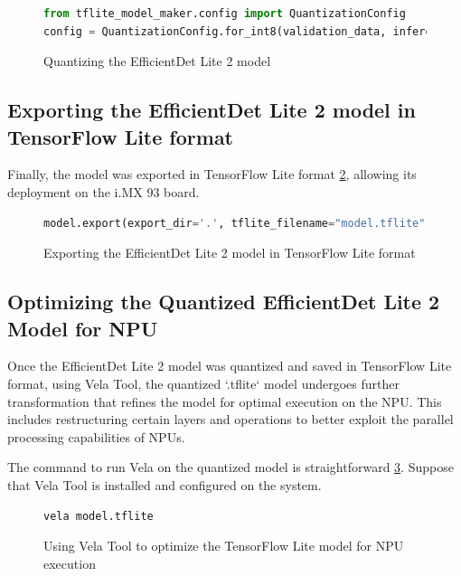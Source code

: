 \begin{figure}[H]
\begin{lstlisting}[language=Python]
from tflite_model_maker.config import QuantizationConfig
config = QuantizationConfig.for_int8(validation_data, inference_input_type=tf.uint8, inference_output_type=tf.float32, supported_ops=[tf.lite.OpsSet.TFLITE_BUILTINS_INT8])
\end{lstlisting}
\caption{Quantizing the EfficientDet Lite 2 model}
\label{code:quantization_efficientdet_lite2}
\end{figure}

\subsection{Exporting the EfficientDet Lite 2 model in TensorFlow Lite format}
Finally, the model was exported in TensorFlow Lite format \ref{code:export_tflite_efficientdet_lite2}, allowing its deployment on the i.MX 93 board.

\begin{figure}[H]
\begin{lstlisting}[language=Python]
model.export(export_dir='.', tflite_filename="model.tflite", quantization_config=config)
\end{lstlisting}
\caption{Exporting the EfficientDet Lite 2 model in TensorFlow Lite format}
\label{code:export_tflite_efficientdet_lite2}
\end{figure}

\subsection{Optimizing the Quantized EfficientDet Lite 2 Model for NPU}
Once the EfficientDet Lite 2 model was quantized and saved in TensorFlow Lite format, using Vela Tool, the quantized `.tflite` model undergoes further transformation that refines the model for optimal execution on the NPU. This includes restructuring certain layers and operations to better exploit the parallel processing capabilities of NPUs.

The command to run Vela on the quantized model is straightforward \ref{code:vela_optimization}. Suppose that Vela Tool is installed and configured on the system.

\begin{figure}[H]
\begin{lstlisting}[language=bash]
vela model.tflite
\end{lstlisting}
\caption{Using Vela Tool to optimize the TensorFlow Lite model for NPU execution}
\label{code:vela_optimization}
\end{figure}

